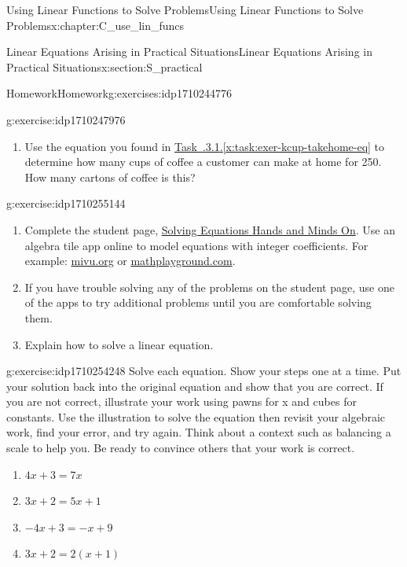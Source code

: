 \documentclass[oneside,10pt,]{book}
\newcommand{\xreffont}{\relax}
\numberwithin{equation}{chapter}
\begin{document}
\begin{chapterptx}{Using Linear Functions to Solve Problems}{}{Using Linear Functions to Solve Problems}{}{}{x:chapter:C_use_lin_funcs}
\begin{sectionptx}{Linear Equations Arising in Practical Situations}{}{Linear Equations Arising in Practical Situations}{}{}{x:section:S_practical}
\begin{exercises-subsection}{Homework}{}{Homework}{}{}{g:exercises:idp1710244776}
\begin{divisionexercise}{1}{}{}{g:exercise:idp1710247976}
\begin{enumerate}[font=\bfseries,label=(\alph*),ref=\alph*]
\item{}Use the equation you found in \hyperref[x:task:exer-kcup-takehome-eq]{Task~{\xreffont 3.1.3.1}.{\xreffont\ref{x:task:exer-kcup-takehome-eq}}} to determine how many cups of coffee a customer can make at home for \textdollar{}250. How many cartons of coffee is this?%
\end{enumerate}
\end{divisionexercise}%
\begin{divisionexercise}{2}{}{}{g:exercise:idp1710255144}%
\begin{enumerate}[font=\bfseries,label=(\alph*),ref=\alph*]
\item{}Complete the student page, \hyperref[x:worksheet:act-eq-hands-on]{Solving Equations \textemdash{} Hands and Minds On}. Use an algebra tile app online to model equations with integer coefficients. For example: \href{http://media.mivu.org/mvu_pd/a4a/homework/index.html}{mivu.org}\footnotemark{} or \href{http://www.mathplayground.com/AlgebraEquations.html}{mathplayground.com}\footnotemark{}.%
\item{}If you have trouble solving any of the problems on the student page, use one of the apps to try additional problems until you are comfortable solving them.%
\item{}Explain how to solve a linear equation.%
\end{enumerate}
\end{divisionexercise}%
%
%
\begin{divisionexercise}{3}{}{}{g:exercise:idp1710254248}%
Solve each equation. Show your steps one at a time. Put your solution back into the original equation and show that you are correct. If you are not correct, illustrate your work using pawns for x and cubes for constants. Use the illustration to solve the equation then revisit your algebraic work, find your error, and try again. Think about a context such as balancing a scale to help you. Be ready to convince others that your work is correct.%
\begin{enumerate}[font=\bfseries,label=(\alph*),ref=\alph*]
\item{}\(4x + 3 = 7x\)%
\item{}\(3x + 2 = 5x + 1\)%
\item{}\(-4x + 3 = -x + 9\)%
\item{}\(3x + 2 = 2 \left( x + 1 \right)\)%

\end{enumerate}
\end{divisionexercise}
\end{exercises-subsection}
\end{sectionptx}
\end{chapterptx}
\end{document}
